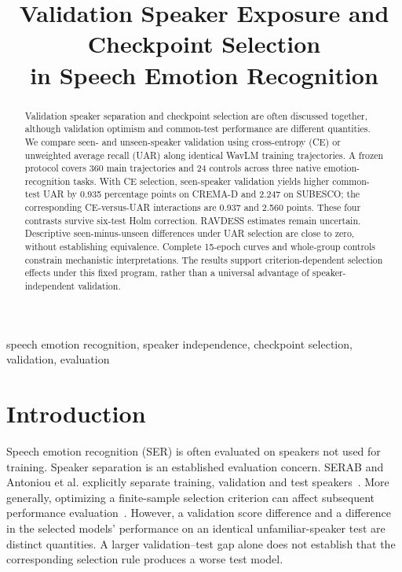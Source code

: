 \documentclass[letterpaper]{article}
\title{Validation Speaker Exposure and Checkpoint Selection\\in Speech Emotion Recognition}
\begin{document}
\maketitle
\begin{abstract}
Validation speaker separation and checkpoint selection are often discussed together, although validation optimism and common-test performance are different quantities. We compare seen- and unseen-speaker validation using cross-entropy (CE) or unweighted average recall (UAR) along identical WavLM training trajectories. A frozen protocol covers 360 main trajectories and 24 controls across three native emotion-recognition tasks. With CE selection, seen-speaker validation yields higher common-test UAR by 0.935 percentage points on CREMA-D and 2.247 on SUBESCO; the corresponding CE-versus-UAR interactions are 0.937 and 2.560 points. These four contrasts survive six-test Holm correction. RAVDESS estimates remain uncertain. Descriptive seen-minus-unseen differences under UAR selection are close to zero, without establishing equivalence. Complete 15-epoch curves and whole-group controls constrain mechanistic interpretations. The results support criterion-dependent selection effects under this fixed program, rather than a universal advantage of speaker-independent validation.
\end{abstract}
\begin{keywords}
speech emotion recognition, speaker independence, checkpoint selection, validation, evaluation
\end{keywords}
\section{Introduction}
Speech emotion recognition (SER) is often evaluated on speakers not used for training. Speaker separation is an established evaluation concern. SERAB and Antoniou et al. explicitly separate training, validation and test speakers~\cite{serab,antoniou}. More generally, optimizing a finite-sample selection criterion can affect subsequent performance evaluation~\cite{cawley}. However, a validation score difference and a difference in the selected models' performance on an identical unfamiliar-speaker test are distinct quantities. A larger validation--test gap alone does not establish that the corresponding selection rule produces a worse test model.
\end{document}
